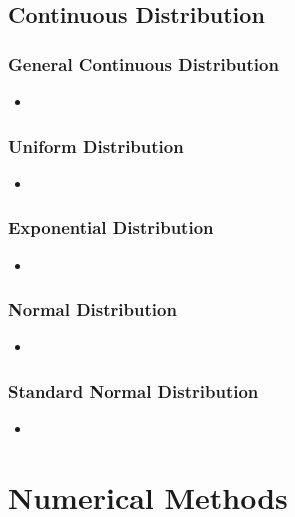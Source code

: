 \documentclass[8pt]{report}
\begin{document}
	\section{Continuous Distribution}
		\subsection{General Continuous Distribution}
			\begin{itemize}
				\item
			\end{itemize}\hrulefill
		\subsection{Uniform Distribution}
			\begin{itemize}
				\item
			\end{itemize}\hrulefill
		\subsection{Exponential Distribution}
			\begin{itemize}
				\item
			\end{itemize}\hrulefill
		\subsection{Normal Distribution}
			\begin{itemize}
				\item
			\end{itemize}\hrulefill
		\subsection{Standard Normal Distribution}
			\begin{itemize}
				\item
			\end{itemize}\hrulefill
\chapter{Numerical Methods}
\end{document}
